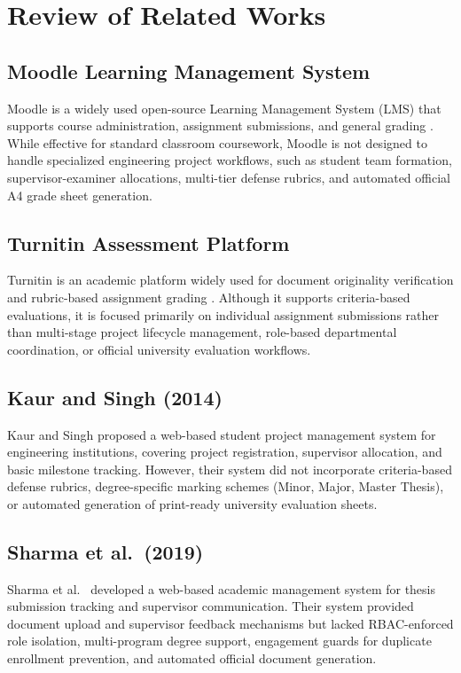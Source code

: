 \documentclass[12pt,a4paper]{report}
\begin{document}
\section{Review of Related Works}

\subsection{Moodle Learning Management System}
Moodle is a widely used open-source Learning Management System (LMS) that supports course administration, assignment submissions, and general grading \cite{ritzer2022moodle}. While effective for standard classroom coursework, Moodle is not designed to handle specialized engineering project workflows, such as student team formation, supervisor-examiner allocations, multi-tier defense rubrics, and automated official A4 grade sheet generation.

\subsection{Turnitin Assessment Platform}
Turnitin is an academic platform widely used for document originality verification and rubric-based assignment grading \cite{turnitin2024feedback}. Although it supports criteria-based evaluations, it is focused primarily on individual assignment submissions rather than multi-stage project lifecycle management, role-based departmental coordination, or official university evaluation workflows.

\subsection{Kaur and Singh (2014)}
Kaur and Singh \cite{kaur2014design} proposed a web-based student project management system for engineering institutions, covering project registration, supervisor allocation, and basic milestone tracking. However, their system did not incorporate criteria-based defense rubrics, degree-specific marking schemes (Minor, Major, Master Thesis), or automated generation of print-ready university evaluation sheets.

\subsection{Sharma et al.\ (2019)}
Sharma et al.\ \cite{sharma2019web} developed a web-based academic management system for thesis submission tracking and supervisor communication. Their system provided document upload and supervisor feedback mechanisms but lacked RBAC-enforced role isolation, multi-program degree support, engagement guards for duplicate enrollment prevention, and automated official document generation.
\end{document}
